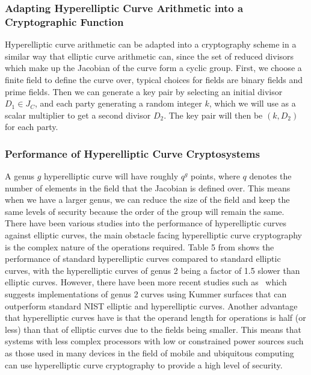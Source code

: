 \subsubsection{Adapting Hyperelliptic Curve Arithmetic into a Cryptographic Function}
Hyperelliptic curve arithmetic can be adapted into a cryptography scheme in a similar way that elliptic curve arithmetic can, since the set of reduced divisors which make up the Jacobian of the curve form a cyclic group. First, we choose a finite field to define the curve over, typical choices for fields are binary fields and prime fields. Then we can generate a key pair by selecting an initial divisor $D_1 \in J_C$, and each party generating a random integer $k$, which we will use as a scalar multiplier to get a second divisor $D_2$. The key pair will then be $(k, D_2)$ for each party.
\subsubsection{Performance of Hyperelliptic Curve Cryptosystems}
A genus $g$ hyperelliptic curve will have roughly $q^g$ points, where $q$ denotes the number of elements in the field that the Jacobian is defined over. This means when we have a larger genus, we can reduce the size of the field and keep the same levels of security because the order of the group will remain the same. There have been various studies into the performance of hyperelliptic curves against elliptic curves, the main obstacle facing hyperelliptic curve cryptography is the complex nature of the operations required. Table 5 from \cite{pelzl2003hyperelliptic} shows the performance of standard hyperelliptic curves compared to standard elliptic curves, with the hyperelliptic curves of genus 2 being a factor of 1.5 slower than elliptic curves. However, there have been more recent studies such as~\cite{cryptoeprint:2012:670} which suggests implementations of genus 2 curves using Kummer surfaces that can outperform standard NIST elliptic and hyperelliptic curves. Another advantage that hyperelliptic curves have is that the operand length for operations is half (or less) than that of elliptic curves due to the fields being smaller. This means that systems with less complex processors with low or constrained power sources such as those used in many devices in the field of mobile and ubiquitous computing can use hyperelliptic curve cryptography to provide a high level of security.
